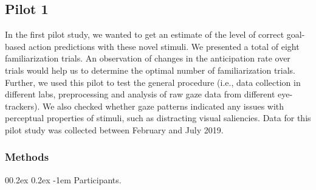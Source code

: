 \documentclass[
  man, donotrepeattitle,floatsintext]{apa6}
\makeatletter
\let\oldparagraph\paragraph
\renewcommand{\paragraph}{
    \@ifstar
      \xxxParagraphStar
      \xxxParagraphNoStar
  }
\newcommand{\xxxParagraphStar}[1]{\oldparagraph*{#1}\mbox{}}
\newcommand{\xxxParagraphNoStar}[1]{\oldparagraph{#1}\mbox{}}
\renewcommand{\paragraph}{\@startsection{paragraph}{4}{\parindent}%
  {0\baselineskip \@plus 0.2ex \@minus 0.2ex}%
  {-1em}%
  {\normalfont\normalsize\bfseries\itshape\typesectitle}}
\makeatother
\begin{document}
\subsection{Pilot 1}\label{pilot-1}

In the first pilot study, we wanted to get an estimate of the level of correct goal-based action predictions with these novel stimuli. We presented a total of eight familiarization trials. An observation of changes in the anticipation rate over trials would help us to determine the optimal number of familiarization trials. Further, we used this pilot to test the general procedure (i.e., data collection in different labs, preprocessing and analysis of raw gaze data from different eye-trackers). We also checked whether gaze patterns indicated any issues with perceptual properties of stimuli, such as distracting visual saliencies. Data for this pilot study was collected between February and July 2019.

\subsubsection{Methods}\label{methods}

\paragraph{Participants.}\label{participants.}
\end{document}
